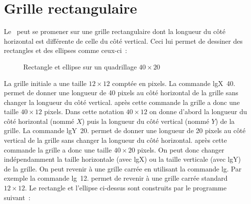 \section{Grille rectangulaire}

Le \robot\ peut se promener sur une grille rectangulaire dont la longueur du côté
horizontal est différente de celle du côté
vertical. Ceci lui per\-met de des\-sin\-er des rec\-tan\-gles et des el\-lip\-ses com\-me ceux-ci~:
\begin{figure}[htbp]
 \caption{Rectangle et ellipse sur un quadrillage $40 \times 20$}
\end{figure}

 La grille initiale a une taille $12 \times 12$ comptée en pixels. La commande {\idt lgX\ 40.} permet de donner
 une longueur de 40 pixels au côté horizontal de la grille sans changer la longueur du côté vertical. après
 cette commande la grille a donc une taille $40 \times 12$ pixels. Dans cette notation $40 \times 12$ on donne
 d'abord la longueur du côté horizontal (nommé $X$) puis la longueur du côté vertical (nommé $Y$)
 de la grille. La commande {\idt lgY\ 20.} permet de donner
 une longueur de 20 pixels au côté vertical de la grille sans changer la longueur du côté horizontal. après
 cette commande la grille a donc une taille $40 \times 20$ pixels. On peut donc changer indépendamment la
  taille horizontale (avec {\idt lgX}) ou la taille verticale (avec {\idt lgY}) de la grille. 
  On peut revenir à une grille carrée en utilisant la commande {\idt lg}.
  Par exemple la commande {\idt lg\ 12.}
  permet de revenir à une grille carrée standard $12 \times 12$. Le rectangle et l'ellipse
 ci-dessus 
  sont construits par le programme suivant~:\hfill
 
 
